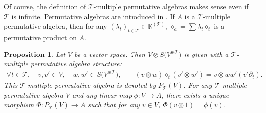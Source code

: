 \documentclass[10pt,a4paper]{amsart}
\numberwithin{equation}{section}
\newtheorem{Proposition}[Theorem]{Proposition}
 { \theoremstyle{definition}
\newtheorem{Definition}[Theorem]{Definition}
\newtheorem{Note}[Theorem]{Note}
\newtheorem{Example}[Theorem]{Example}
\newtheorem{Remark}[Theorem]{Remark}
\newtheorem{Notation}[Theorem]{Notation}}
\newcommand{\K}{\mathbb{K}}
\newcommand{\T}{\mathcal{T}}
\begin{document}
Of course, the definition of $\T$-multiple permutative algebras makes sense even if $\T$ is infinite.
Permutative algebras are introduced in \cite{Chapoton}. If $A$ is a $\T$-multiple permutative algebra,
then for any $(\lambda_t)_{t\in \T}\in \K^{(\T)}$, $\diamond_a=\sum \lambda_t\diamond_t$ is a permutative product on $A$.

\begin{Proposition} \label{prop13}
Let $V$ be a vector space. Then $V\otimes S\big(V^{\oplus\T}\big)$ is given with a $\T$-multiple permutative algebra structure:
\begin{gather*}
\forall t\in \T,\quad v,v'\in V,\quad w,w'\in S\big(V^{\oplus\T}\big),\qquad
(v\otimes w)\diamond_t (v'\otimes w')=v \otimes ww' (v'\partial_t).
\end{gather*}
This $\T$-multiple permutative algebra is denoted by $P_\T(V)$.
For any $\T$-multiple permutative algebra $V$ and any linear map $\phi\colon V\longrightarrow A$,
there exists a unique morphism $\Phi\colon P_\T(V)\longrightarrow A$ such that for any $v\in V$, $\Phi(v\otimes 1)=\phi(v)$.
\end{Proposition}
\end{document}
